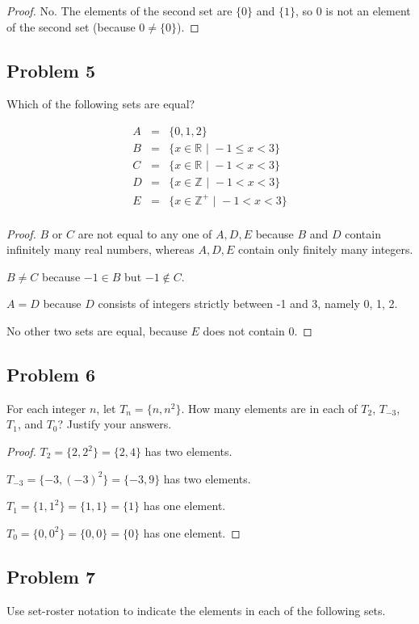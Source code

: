 \documentclass[14pt]{extarticle}
\newcommand{\R}{\mathbb{R}}
\newcommand{\Z}{\mathbb{Z}}
\begin{document}
\begin{proof}
No. The elements of the second set are $\{0\}$ and $\{1\}$, so 0 is not an
element of the second set (because $0 \neq \{0\}$).
\end{proof}

\subsection{Problem 5}
Which of the following sets are equal?

$$
\begin{array}{ccl}
A & = & \{0, 1, 2\} \\
B & = & \{x \in \R \,\, | \,\, -1 \leq x < 3\} \\
C & = & \{x \in \R \,\, | \,\, -1 < x < 3\} \\
D & = & \{x \in \Z \,\, | \,\, -1 < x < 3\} \\
E & = & \{x \in \Z^+ \,\, | \,\, -1 < x < 3\} \\
\end{array}
$$

\begin{proof}
$B$ or $C$ are not equal to any one of $A, D, E$ because $B$ and $D$ contain
infinitely many real numbers, whereas $A, D, E$ contain only finitely many
integers.

$B \neq C$ because $-1 \in B$ but $-1 \notin C$.

$A = D$ because $D$ consists of integers strictly between -1 and 3, namely 0, 1,
 2.

No other two sets are equal, because $E$ does not contain 0.
\end{proof}

\subsection{Problem 6}
For each integer $n$, let $T_n = \{n, n^2\}$. How many elements are in each of
$T_2$, $T_{-3}$, $T_1$, and $T_0$? Justify your answers.

\begin{proof}
$T_2 = \{2, 2^2\} = \{2, 4\}$ has two elements.

$T_{-3} = \{-3, (-3)^2\} = \{-3, 9\}$ has two elements.

$T_1 = \{1, 1^2\} = \{1, 1\} = \{1\}$ has one element.

$T_0 = \{0, 0^2\} = \{0, 0\} = \{0\}$ has one element.
\end{proof}

\subsection{Problem 7}
Use set-roster notation to indicate the elements in each of the following sets.
\end{document}
